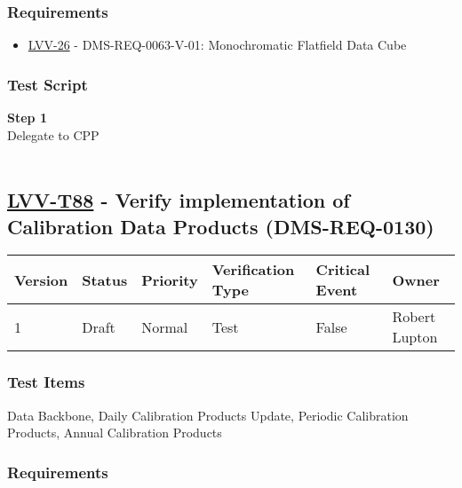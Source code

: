 \hypertarget{requirements-64}{%
\subsubsection{Requirements}\label{requirements-64}}

\begin{itemize}
\tightlist
\item
  \href{https://jira.lsstcorp.org/browse/LVV-26}{LVV-26} -
  DMS-REQ-0063-V-01: Monochromatic Flatfield Data Cube
\end{itemize}

\hypertarget{test-script-64}{%
\subsubsection{Test Script}\label{test-script-64}}

\textbf{Step 1}\\
Delegate to CPP\\
~\\

\hypertarget{lvv-t88---verify-implementation-of-calibration-data-products-dms-req-0130}{%
\subsection{\texorpdfstring{\href{https://jira.lsstcorp.org/secure/Tests.jspa\#/testCase/LVV-T88}{LVV-T88}
- Verify implementation of Calibration Data Products
(DMS-REQ-0130)}{LVV-T88 - Verify implementation of Calibration Data Products (DMS-REQ-0130)}}\label{lvv-t88---verify-implementation-of-calibration-data-products-dms-req-0130}}

\begin{longtable}[]{@{}llllll@{}}
\toprule
Version & Status & Priority & Verification Type & Critical Event &
Owner\tabularnewline
\midrule
\endhead
1 & Draft & Normal & Test & False & Robert Lupton\tabularnewline
\bottomrule
\end{longtable}

\hypertarget{test-items-64}{%
\subsubsection{Test Items}\label{test-items-64}}

Data Backbone, Daily Calibration Products Update, Periodic Calibration
Products, Annual Calibration Products

\hypertarget{requirements-65}{%
\subsubsection{Requirements}\label{requirements-65}}

